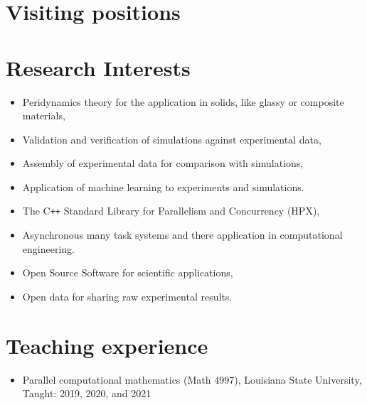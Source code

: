 \documentclass[11pt,a4paper,sans]{moderncv}
\begin{document}
\section{Visiting positions}
\section{Research Interests}

\begin{itemize}[leftmargin=4cm]
\item Peridynamics theory for the application in solids, like glassy or composite materials,
\item Validation and verification of simulations against experimental data,
\item Assembly of experimental data for comparison with simulations,
\item Application of machine learning to experiments and simulations.
\end{itemize}
\begin{itemize}[leftmargin=4cm]
\item The C\texttt{++} Standard Library for Parallelism and Concurrency (HPX),
\item Asynchronous many task systems and there application in computational engineering.
\end{itemize}
\begin{itemize}[leftmargin=4cm]
\item Open Source Software for scientific applications,
\item Open data for sharing raw experimental results.
\end{itemize}
\section{Teaching experience}
\begin{itemize}[leftmargin=4cm]
\item Parallel computational mathematics (Math 4997), Louisiana State University, Taught: 2019, 2020, and 2021
\end{itemize}
\end{document}

